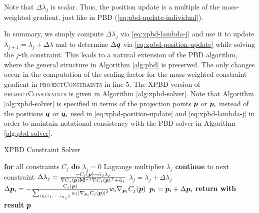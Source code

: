\noindent Note that $\Delta \lambda_j$ is scalar. Thus, the position update is a multiple of the mass-weighted gradient, just like in PBD 
(\cref{eq:pbd-update-individual}).

In summary, we simply compute $\Delta \lambda_j$ via \autoref{eq:xpbd-lambda-j} and use it to 
update $\lambda_{j+1} = \lambda_j + \Delta \lambda$ and to determine $\Delta \bm{q}$ via \autoref{eq:xpbd-position-update} while solving the $j$-th constraint. 
This leads to a natural extension of the PBD algorithm, where the general structure in Algorithm \ref{alg:pbd} is preserved. The only changes occur in the 
computation of the scaling factor for the 
mass-weighted constraint gradient in \textsc{projectConstraints} in line 5. The XPBD version of \textsc{projectConstraints} is given in 
Algorithm \ref{alg:xpbd-solver}. Note that Algorithm \ref{alg:xpbd-solver} is specified in terms of the projection points $\bm{p}$ or $\bm{p}_i$ instead of the 
positions $\bm{q}$ or $\bm{q}_i$ used in \autoref{eq:xpbd-position-update} and \autoref{eq:xpbd-lambda-j} in order to maintain notational consistency with the
PBD solver in Algorithm \ref{alg:pbd-solver}.

\begin{algorithm}
\caption{XPBD Constraint Solver}\label{alg:xpbd-solver}
\begin{algorithmic}[1]
\State \textbf{for} all constraints $C_j$ \textbf{do} $\lambda_j = 0$
\StatexIndent[3] Lagrange multiplier $\lambda_j$ \algorithmicdo
{}
\State \textbf{continue} to next constraint
\EndIf
\State $\Delta \lambda_j = \frac{-C_j(\bm{p}) - \tilde{\alpha}_j \lambda_{j}}{\nabla C_j(\bm{p}) \mathbf{M}^{-1} \nabla C_j(\bm{p})^T + \tilde{\alpha}_j}$
\State $\lambda_{j} = \lambda_{j} + \Delta \lambda_j$
\State $\Delta \bm{p}_i = -\frac{C_j(\bm{p})}{\sum_{i \in \{ i_1, \ldots, i_{n_j} \}} w_i \vert \nabla_{\bm{p}_i}C_j(\bm{p}) \vert^2 } w_i 
\nabla_{\bm{p}_i} C_j(\bm{p})$
\State $\bm{p}_i = \bm{p}_i + \Delta \bm{p}_i$
\EndFor
\EndFor
\EndFor
\State \textbf{return with result } $\bm{p}$
\EndProcedure
\end{algorithmic}
\end{algorithm}

